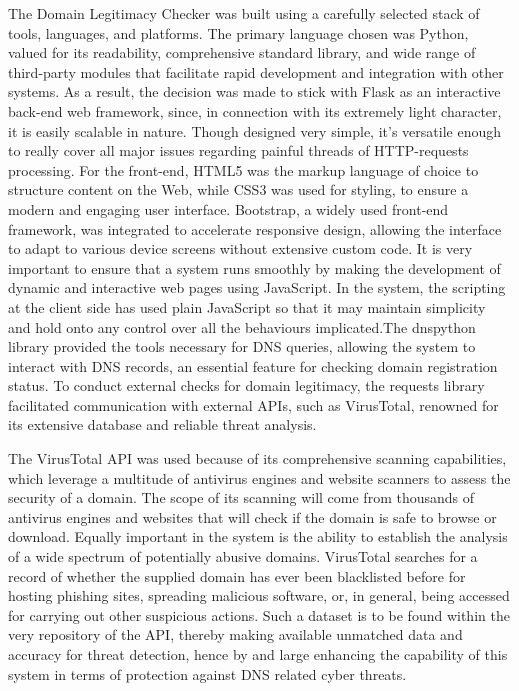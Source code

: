The Domain Legitimacy Checker was built using a carefully selected stack of tools, languages, and platforms. The primary language chosen was Python, valued for its readability, comprehensive standard library, and wide range of third-party modules that facilitate rapid development and integration with other systems. As a result, the decision was made to stick with Flask as an interactive back-end web framework, since, in connection with its extremely light character, it is easily scalable in nature. Though designed very simple, it's versatile enough to really cover all major issues regarding painful threads of HTTP-requests processing. For the front-end, HTML5 was the markup language of choice to structure content on the Web, while CSS3 was used for styling, to ensure a modern and engaging user interface. Bootstrap, a widely used front-end framework, was integrated to accelerate responsive design, allowing the interface to adapt to various device screens without extensive custom code. It is very important to ensure that a system runs smoothly by making the development of dynamic and interactive web pages using JavaScript. In the system, the scripting at the client side has used plain JavaScript so that it may maintain simplicity and hold onto any control over all the behaviours implicated.The dnspython library provided the tools necessary for DNS queries, allowing the system to interact with DNS records, an essential feature for checking domain registration status. To conduct external checks for domain legitimacy, the requests library facilitated communication with external APIs, such as VirusTotal, renowned for its extensive database and reliable threat analysis. 

The VirusTotal API was used because of its comprehensive scanning capabilities, which leverage a multitude of antivirus engines and website scanners to assess the security of a domain. The scope of its scanning will come from thousands of antivirus engines and websites that will check if the domain is safe to browse or download. Equally important in the system is the ability to establish the analysis of a wide spectrum of potentially abusive domains. VirusTotal searches for a record of whether the supplied domain has ever been blacklisted before for hosting phishing sites, spreading malicious software, or, in general, being accessed for carrying out other suspicious actions. Such a dataset is to be found within the very repository of the API, thereby making available unmatched data and accuracy for threat detection, hence by and large enhancing the capability of this system in terms of protection against DNS related cyber threats.



